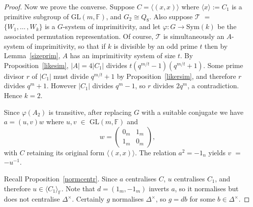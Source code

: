 \documentclass[12pt]{amsart}
\theoremstyle{definition}
\theoremstyle{remark}
\begin{document}
\begin{proof}
 Now we prove the converse. Suppose 
 $C = \langle (x,x) \rangle$ where 
 $\langle x \rangle := C_1$ is a primitive subgroup of 
 $\mathrm{GL}(m, \mathbb{F})$, and $G_2 \cong Q_8$.
 Also suppose $\mathcal{T}$ $=$ $\{  W_1 , \ldots \, \! ,  W_k\}$
 is a $G$-system of imprimitivity, and let $\varphi
 : G \rightarrow \mathrm{Sym}(k)$ be the associated 
 permutation representation.
 Of course, $\mathcal{T}$ is simultaneously an $A$-system of 
 imprimitivity, so that
 if $k$ is divisible by an odd prime $t$
 then by Lemma~\ref{sizeprim}, $A$ has an imprimitivity 
 system of size $t$.
 By Proposition~\ref{likesim}, $|A| = 4|C_1|$ divides 
 $t(q^{m/t}-1)(q^{m/t}+1)$.  
 Some prime divisor $r$ of $|C_1|$ must divide $q^{m/t}+1$
 by Proposition~\ref{likersim}, and therefore $r$ divides $q^m+1$.
 However $|C_1|$ divides $q^m-1$, so $r$ divides $2q^m$, 
 a contradiction. 
 Hence $k=2$.
% 
%
%
%
 
 Since
 $\varphi(A_2)$ is transitive, after replacing $G$ 
 with a suitable conjugate we have $a = (u, v) w$
 where $u, v$ $\in$ $\mathrm{GL}(m, \mathbb{F})$ and
$$
 w = 
 \left( \begin{array}{cc}
 0_m & 1_m \\
  1_m & 0_m 
 \end{array}
 \right) ,
$$
 with $C$ retaining its original form
 $\langle (x,x) \rangle$. The relation 
 $a^2 = -1_n$ yields $v$ $=$ $-u ^{-1}$.

 Recall Proposition~\ref{normcentr}.
 Since $a$ centralises $C$, $u$ centralises $C_1$,
 and therefore $u \in \langle C_1\rangle_\mathbb{F}$.
 Note that $d =  (1_m, -1_m)$ inverts $a$, so
  it normalises but does not centralise 
 $\Delta^{\! \times}$. Certainly $g$ normalises  
 $\Delta^{\! \times}$, so
  $g = db$ for some $b \in \Delta^{\! \times}$.
 

\end{proof}
\end{document}
